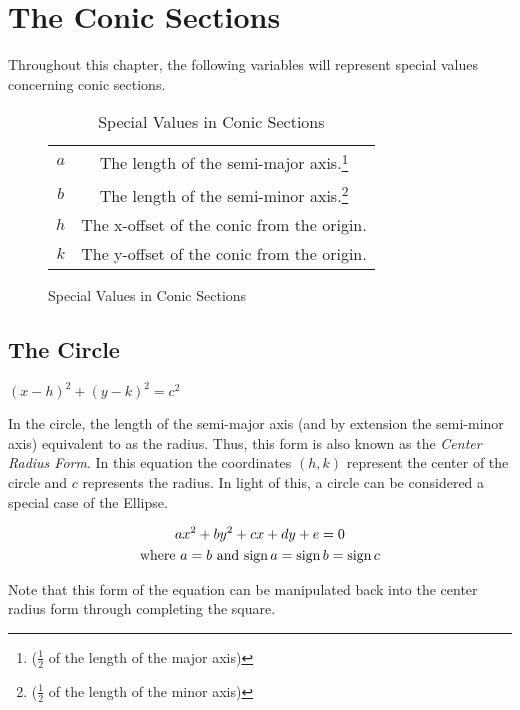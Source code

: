 \chapter{The Conic Sections}
Throughout this chapter, the following variables will represent special values concerning conic sections.
\begin{figure}[H]
    \begin{minipage}{\textwidth}
        \begin{table}[H]
        \caption{Special Values in Conic Sections}
        \centering
        \begin{tabular}{c c}
        \hline
        $a$ & The length of the semi-major axis.\footnote{($\frac{1}{2}$ of the length of the major axis)}\\
        $b$ & The length of the semi-minor axis.\footnote{($\frac{1}{2}$ of the length of the minor axis)}\\
        $h$ & The x-offset of the conic from the origin.\\
        $k$ & The y-offset of the conic from the origin.\\
        \hline
        \end{tabular}
        \label{table:SpecValsConics}
        \end{table}
    \end{minipage}
\end{figure}

\section{The Circle}
\begin{defn}
$\displaystyle{(x-h)^{2}+(y-k)^{2}=c^{2}}$
\end{defn}
In the circle, the length of the semi-major axis (and by extension the semi-minor axis) equivalent to as the radius. Thus, this form is also known as the \emph{Center Radius Form}. In this equation the coordinates $(h,k)$ represent the center of the circle and $c$ represents the radius. In light of this, a circle can be considered a special case of the Ellipse.

\begin{defn}
\begin{gather*}
\displaystyle{ax^{2}+by^{2}+cx+dy+e=0}\\
\text{where $a=b$ and $\operatorname{sign}{a}=\operatorname{sign}{b}=\operatorname{sign}{c}$}
\end{gather*}
\end{defn}
Note that this form of the equation can be manipulated back into the center radius form through completing the square.

